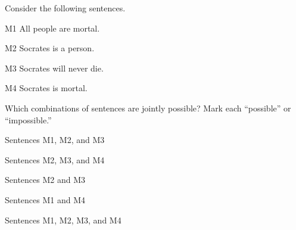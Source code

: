 \problempart Consider the following sentences.
\begin{compactlist}%
\item[M1] \label{itm:allmortal} All people are mortal.
\item[M2] \label{itm:socperson} Socrates is a person.
\item[M3] \label{itm:socnotdie} Socrates will never die.
\item[M4] \label{itm:socmortal} Socrates is mortal.
\end{compactlist}
Which combinations of sentences are jointly possible? Mark each ``possible'' or ``impossible.''
\begin{compactlist}
\item Sentences M1, M2, and M3
\item Sentences M2, M3, and M4
\item Sentences M2 and M3
\item Sentences M1 and M4
\item Sentences M1, M2, M3, and M4
\end{compactlist}


